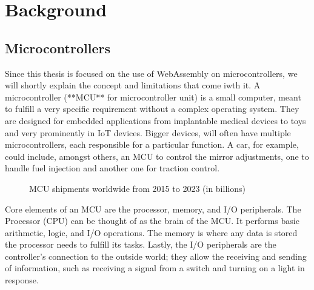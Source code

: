 
\chapter{Background}\label{chapter:background}

\section{Microcontrollers}
Since this thesis is focused on the use of WebAssembly on microcontrollers, we will shortly explain the concept and limitations that come iwth it. A microcontroller (**MCU** for microcontroller unit) is a small computer, meant to fulfill a very specific requirement without a complex operating system. They are designed for embedded applications from implantable medical devices to toys and very prominently in IoT devices. Bigger devices, will often have multiple microcontrollers, each responsible for a particular function. A car, for example, could include, amongst others, an MCU to control the mirror adjustments, one to handle fuel injection and another one for traction control.

\begin{figure}[h]
    \caption{MCU shipments worldwide from 2015 to 2023 (in billions)}
\end{figure}

Core elements of an MCU are the processor, memory, and I/O peripherals. The Processor (CPU) can be thought of as the brain of the MCU. It performs basic arithmetic, logic, and I/O operations. The memory is where any data is stored the processor needs to fulfill its tasks. Lastly, the I/O peripherals are the controller's connection to the outside world; they allow the receiving and sending of information, such as receiving a signal from a switch and turning on a light in response.

